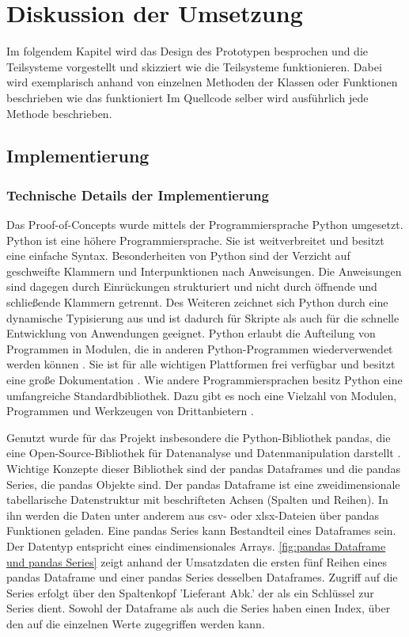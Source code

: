 \chapter{Diskussion der Umsetzung}
\label{chap:five}
Im folgendem Kapitel wird das Design des Prototypen besprochen und die Teilsysteme vorgestellt und skizziert wie die Teilsysteme
funktionieren. Dabei wird exemplarisch anhand von einzelnen Methoden der Klassen oder Funktionen beschrieben wie das funktioniert
Im Quellcode selber wird ausführlich jede Methode beschrieben.
\section{Implementierung}
    \subsection{Technische Details der Implementierung}
    Das Proof-of-Concepts wurde mittels der Programmiersprache Python umgesetzt.
    Python ist eine höhere Programmiersprache. Sie ist weitverbreitet \cite[vgl.][]{loukides_where_2021} und besitzt
    eine einfache Syntax. Besonderheiten von Python sind der Verzicht auf geschweifte Klammern und Interpunktionen nach Anweisungen.
    Die Anweisungen sind dagegen durch Einrückungen strukturiert und nicht durch öffnende und schließende Klammern
    getrennt. Des Weiteren zeichnet sich Python durch eine dynamische Typisierung aus und ist dadurch für Skripte als auch 
    für die schnelle Entwicklung von Anwendungen geeignet. Python erlaubt die Aufteilung von Programmen in Modulen, die in anderen Python-Programmen wiederverwendet werden können
    \cite[vgl.][]{python_6_2021}.
    Sie ist für alle wichtigen Plattformen frei verfügbar und besitzt eine große Dokumentation \cite[vgl.][]{python_welcome_2021}.
    Wie andere Programmiersprachen besitz Python eine umfangreiche Standardbibliothek. 
    Dazu gibt es noch eine Vielzahl von Modulen, Programmen und Werkzeugen von Drittanbietern \cite[vgl.][]{python_pypi_2021}.
    
    
    Genutzt wurde für das Projekt insbesondere die Python-Bibliothek pandas, die eine Open-Source-Bibliothek für Datenanalyse und 
    Datenmanipulation darstellt \cite[vgl.][]{pandas_pandas_2021}. 
    Wichtige Konzepte dieser Bibliothek sind der pandas Dataframes und die pandas Series, die pandas Objekte sind. Der pandas Dataframe ist eine zweidimensionale 
    tabellarische Datenstruktur mit beschrifteten Achsen (Spalten und Reihen). In ihn
    werden die Daten unter anderem aus csv- oder xlsx-Dateien über pandas Funktionen geladen.
    Eine pandas Series kann Bestandteil eines Dataframes sein. Der Datentyp entspricht eines eindimensionales Arrays. \autoref{fig:pandas Dataframe und pandas Series} zeigt anhand der Umsatzdaten die ersten fünf Reihen
    eines pandas Dataframe und einer pandas Series desselben Dataframes. Zugriff auf die Series erfolgt über
    den Spaltenkopf 'Lieferant Abk.' der als ein Schlüssel zur Series dient. Sowohl der Dataframe als auch die Series haben einen Index, 
    über den auf die einzelnen Werte zugegriffen werden kann. 
    
